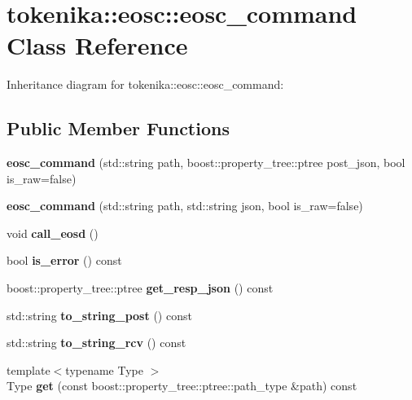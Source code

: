 \hypertarget{classtokenika_1_1eosc_1_1eosc__command}{}\section{tokenika\+:\+:eosc\+:\+:eosc\+\_\+command Class Reference}
\label{classtokenika_1_1eosc_1_1eosc__command}


Inheritance diagram for tokenika\+:\+:eosc\+:\+:eosc\+\_\+command\+:
\subsection*{Public Member Functions}
\begin{DoxyCompactItemize}
\item 
\mbox{\label{classtokenika_1_1eosc_1_1eosc__command_aba83bc240bdb6e6f440d3ed4f79d7c3b}} 
{\bfseries eosc\+\_\+command} (std\+::string path, boost\+::property\+\_\+tree\+::ptree post\+\_\+json, bool is\+\_\+raw=false)
\item 
\mbox{\label{classtokenika_1_1eosc_1_1eosc__command_a177ee5b5c33c39157b94f9e3f78989e1}} 
{\bfseries eosc\+\_\+command} (std\+::string path, std\+::string json, bool is\+\_\+raw=false)
\item 
\mbox{\label{classtokenika_1_1eosc_1_1eosc__command_aad87eaafef2dd42c6ed97c9656322cb5}} 
void {\bfseries call\+\_\+eosd} ()
\item 
\mbox{\label{classtokenika_1_1eosc_1_1eosc__command_ae61121f3dff9a2901f5296d2db7a113a}} 
bool {\bfseries is\+\_\+error} () const
\item 
\mbox{\label{classtokenika_1_1eosc_1_1eosc__command_a3ba126c36fc8696b66f91c664570decf}} 
boost\+::property\+\_\+tree\+::ptree {\bfseries get\+\_\+resp\+\_\+json} () const
\item 
\mbox{\label{classtokenika_1_1eosc_1_1eosc__command_adbbcb056865965d2e5b9824500ebcb6f}} 
std\+::string {\bfseries to\+\_\+string\+\_\+post} () const
\item 
\mbox{\label{classtokenika_1_1eosc_1_1eosc__command_a7c31e6619f98eac22046efdb53a8d20f}} 
std\+::string {\bfseries to\+\_\+string\+\_\+rcv} () const
\item 
\mbox{\label{classtokenika_1_1eosc_1_1eosc__command_ab2f261bfaaf844d089f0ab40636ef696}} 
{\footnotesize template$<$typename Type $>$ }\\Type {\bfseries get} (const boost\+::property\+\_\+tree\+::ptree\+::path\+\_\+type \&path) const
\end{DoxyCompactItemize}
